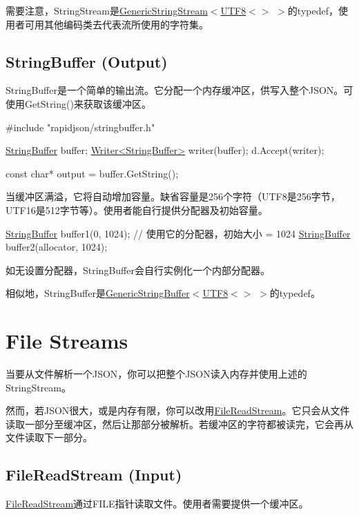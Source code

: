 需要注意，{\ttfamily String\+Stream}是{\ttfamily \hyperlink{struct_generic_string_stream}{Generic\+String\+Stream}$<$\hyperlink{struct_u_t_f8}{U\+T\+F8}$<$$>$ $>$}的typedef，使用者可用其他编码类去代表流所使用的字符集。\hypertarget{md_Cadriciel_Commun_Externe_RapidJSON_doc_stream.zh-cn_StringBuffer}{}\subsection{String\+Buffer (\+Output)}\label{md_Cadriciel_Commun_Externe_RapidJSON_doc_stream.zh-cn_StringBuffer}
{\ttfamily String\+Buffer}是一个简单的输出流。它分配一个内存缓冲区，供写入整个\+J\+S\+O\+N。可使用{\ttfamily Get\+String()}来获取该缓冲区。


\begin{DoxyCode}
\textcolor{preprocessor}{#include "rapidjson/stringbuffer.h"}

\hyperlink{class_generic_string_buffer}{StringBuffer} buffer;
\hyperlink{class_writer}{Writer<StringBuffer>} writer(buffer);
d.Accept(writer);

\textcolor{keyword}{const} \textcolor{keywordtype}{char}* output = buffer.GetString();
\end{DoxyCode}


当缓冲区满溢，它将自动增加容量。缺省容量是256个字符（\+U\+T\+F8是256字节，\+U\+T\+F16是512字节等）。使用者能自行提供分配器及初始容量。


\begin{DoxyCode}
\hyperlink{class_generic_string_buffer}{StringBuffer} buffer1(0, 1024); \textcolor{comment}{// 使用它的分配器，初始大小 = 1024}
\hyperlink{class_generic_string_buffer}{StringBuffer} buffer2(allocator, 1024);
\end{DoxyCode}


如无设置分配器，{\ttfamily String\+Buffer}会自行实例化一个内部分配器。

相似地，{\ttfamily String\+Buffer}是{\ttfamily \hyperlink{class_generic_string_buffer}{Generic\+String\+Buffer}$<$\hyperlink{struct_u_t_f8}{U\+T\+F8}$<$$>$ $>$}的typedef。\hypertarget{md_Cadriciel_Commun_Externe_RapidJSON_doc_stream.zh-cn_FileStreams}{}\section{File Streams}\label{md_Cadriciel_Commun_Externe_RapidJSON_doc_stream.zh-cn_FileStreams}
当要从文件解析一个\+J\+S\+O\+N，你可以把整个\+J\+S\+O\+N读入内存并使用上述的{\ttfamily String\+Stream}。

然而，若\+J\+S\+O\+N很大，或是内存有限，你可以改用{\ttfamily \hyperlink{class_file_read_stream}{File\+Read\+Stream}}。它只会从文件读取一部分至缓冲区，然后让那部分被解析。若缓冲区的字符都被读完，它会再从文件读取下一部分。\hypertarget{md_Cadriciel_Commun_Externe_RapidJSON_doc_stream.zh-cn_FileReadStream}{}\subsection{File\+Read\+Stream (\+Input)}\label{md_Cadriciel_Commun_Externe_RapidJSON_doc_stream.zh-cn_FileReadStream}
{\ttfamily \hyperlink{class_file_read_stream}{File\+Read\+Stream}}通过{\ttfamily F\+I\+LE}指针读取文件。使用者需要提供一个缓冲区。


